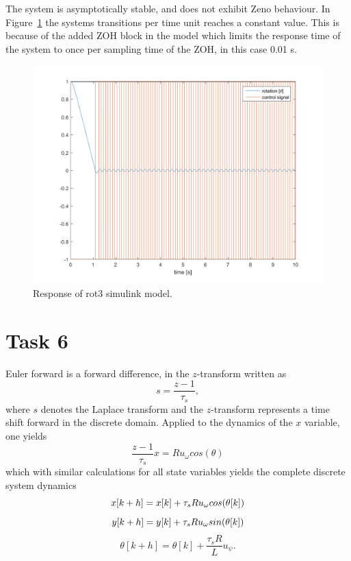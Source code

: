 \documentclass[a4paper,12pt,oneside,onecolumn]{article} %
\begin{document}
	The system is asymptotically stable, and does not exhibit Zeno behaviour. In Figure~\ref{fig:task5_plot} the systems transitions per time unit reaches a constant value. This is because of the added ZOH block in the model which limits the response time of the system to once per sampling time of the ZOH, in this case 0.01 s.
	\begin{figure}[H]
        \centering
        \includegraphics[scale = 0.5, width=1\linewidth]{../matlab/images/task5_plot.png}
        \caption{Response of rot3 simulink model.}
        \label{fig:task5_plot}
    \end{figure}

\section*{Task 6}

Euler forward is a forward difference, in the $z$-transform written as
\begin{equation}
s = \frac{z-1}{\tau_s},
\end{equation}
where $s$ denotes the Laplace transform and the $z$-transform represents a time shift forward in the discrete domain. Applied to the dynamics of the $x$ variable, one yields
\begin{equation}
\frac{z-1}{\tau_s}x=Ru_\omega cos(\theta)
\end{equation}
which with similar calculations for all state variables yields the complete discrete system dynamics
\begin{equation}
\label{eq:xsystem}
x[k+h] = x[k] + \tau_s R u_\omega cos(\theta [k])	\\
\end{equation}
\begin{equation}
\label{eq:ysystem}
y[k+h] = y[k] + \tau_s R u_\omega sin(\theta [k]) \\
\end{equation}
\begin{equation}
\label{thetadynamics}
\theta[k+h] = \theta [k] + \frac{\tau_s R}{L} u_\psi.
\end{equation}
\end{document}
